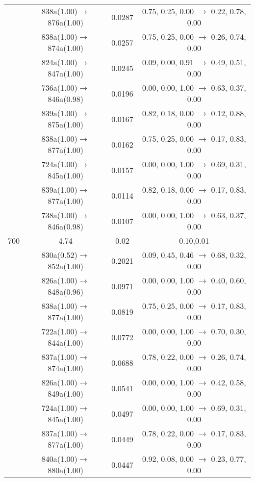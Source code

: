 \documentclass[10pt,a4paper]{article}
\begin{document}
\begin{longtable}{c|c|c|c}
 	& 838a(1.00)$\rightarrow$876a(1.00) &	 0.0287 &	 0.75, 0.25, 0.00 $\rightarrow$ 0.22, 0.78, 0.00 \\ 
 	& 838a(1.00)$\rightarrow$874a(1.00) &	 0.0257 &	 0.75, 0.25, 0.00 $\rightarrow$ 0.26, 0.74, 0.00 \\ 
 	& 824a(1.00)$\rightarrow$847a(1.00) &	 0.0245 &	 0.09, 0.00, 0.91 $\rightarrow$ 0.49, 0.51, 0.00 \\ 
 	& 736a(1.00)$\rightarrow$846a(0.98) &	 0.0196 &	 0.00, 0.00, 1.00 $\rightarrow$ 0.63, 0.37, 0.00 \\ 
 	& 839a(1.00)$\rightarrow$875a(1.00) &	 0.0167 &	 0.82, 0.18, 0.00 $\rightarrow$ 0.12, 0.88, 0.00 \\ 
 	& 838a(1.00)$\rightarrow$877a(1.00) &	 0.0162 &	 0.75, 0.25, 0.00 $\rightarrow$ 0.17, 0.83, 0.00 \\ 
 	& 724a(1.00)$\rightarrow$845a(1.00) &	 0.0157 &	 0.00, 0.00, 1.00 $\rightarrow$ 0.69, 0.31, 0.00 \\ 
 	& 839a(1.00)$\rightarrow$877a(1.00) &	 0.0114 &	 0.82, 0.18, 0.00 $\rightarrow$ 0.17, 0.83, 0.00 \\ 
 	& 738a(1.00)$\rightarrow$846a(0.98) &	 0.0107 &	 0.00, 0.00, 1.00 $\rightarrow$ 0.63, 0.37, 0.00 \\ 
 \hline700 &	 4.74 &	 0.02 &	 0.10,0.01 \\ 
  	& 830a(0.52)$\rightarrow$852a(1.00) &	 0.2021 &	 0.09, 0.45, 0.46 $\rightarrow$ 0.68, 0.32, 0.00 \\ 
 	& 826a(1.00)$\rightarrow$848a(0.96) &	 0.0971 &	 0.00, 0.00, 1.00 $\rightarrow$ 0.40, 0.60, 0.00 \\ 
 	& 838a(1.00)$\rightarrow$877a(1.00) &	 0.0819 &	 0.75, 0.25, 0.00 $\rightarrow$ 0.17, 0.83, 0.00 \\ 
 	& 722a(1.00)$\rightarrow$844a(1.00) &	 0.0772 &	 0.00, 0.00, 1.00 $\rightarrow$ 0.70, 0.30, 0.00 \\ 
 	& 837a(1.00)$\rightarrow$874a(1.00) &	 0.0688 &	 0.78, 0.22, 0.00 $\rightarrow$ 0.26, 0.74, 0.00 \\ 
 	& 826a(1.00)$\rightarrow$849a(1.00) &	 0.0541 &	 0.00, 0.00, 1.00 $\rightarrow$ 0.42, 0.58, 0.00 \\ 
 	& 724a(1.00)$\rightarrow$845a(1.00) &	 0.0497 &	 0.00, 0.00, 1.00 $\rightarrow$ 0.69, 0.31, 0.00 \\ 
 	& 837a(1.00)$\rightarrow$877a(1.00) &	 0.0449 &	 0.78, 0.22, 0.00 $\rightarrow$ 0.17, 0.83, 0.00 \\ 
 	& 840a(1.00)$\rightarrow$880a(1.00) &	 0.0447 &	 0.92, 0.08, 0.00 $\rightarrow$ 0.23, 0.77, 0.00 \\ 

\end{longtable}
\end{document}
